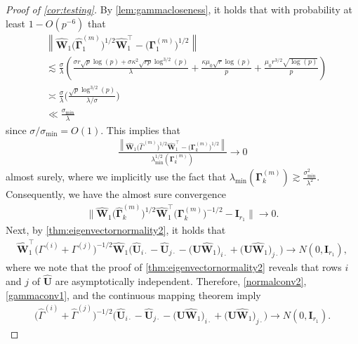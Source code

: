 \documentclass[10pt]{article}
\newcommand{\0}{{\mathbf{0}}}
\newcommand{\1}{{\mathbf{1}}}
\newcommand{\U}{{\mathbf{U}}}
\renewcommand{\t}{^{\top}}
\newcommand{\uhat}{\mathbf{\hat{U}}}
\renewcommand{\hat}{\widehat}
\renewcommand{\hat}{\widehat}
\begin{document}
\begin{proof}[Proof of \cref{cor:testing}]
By \cref{lem:gammacloseness}, it holds that with probability at least $1 - O(p^{-6})$ that
\begin{align*}
    &\left\|\hat{\mathbf{W}}_{1} \big(\mathbf{\hat{\Gamma}}^{(m)}_1\big)^{1/2} \hat{\mathbf{W}}_{1}^{\top}-\big(\mathbf{\Gamma}^{(m)}_1\big)^{1/2}\right\| \\
    &\lesssim \frac{\sigma}{\lambda}\left(\frac{\sigma r \sqrt{p} \log (p)+\sigma \kappa^{2} \sqrt{r p} \log ^{3 / 2}(p)}{\lambda}+\frac{\kappa \mu_{0} \sqrt{r} \log (p)}{p}+\frac{\mu_{0} r^{3 / 2} \sqrt{\log (p)}}{p}\right) \\
    &\asymp \frac{\sigma}{\lambda} \bigg( \frac{\sqrt{p} \log^{3/2}(p)}{\lambda/\sigma} \bigg) \\
    &\ll \frac{\sigma_{\min}}{\lambda}
\end{align*}
since $\sigma/\sigma_{\min} = O(1)$. This implies that
\begin{align*}
  \frac{  \left\|\hat{\mathbf{W}}_{1} \big(\hat{\Gamma}^{(m)}\big)^{1/2} \hat{\mathbf{W}}_{1}^{\top}-\big(\mathbf{\Gamma}^{(m)}_k\big)^{1/2}\right\|}{\lambda_{\min}^{1/2}(\mathbf{\Gamma}^{(m)}_k)} \to 0 
\end{align*}
almost surely, where we implicitly use the fact that $\lambda_{\min}(\mathbf{\Gamma}^{(m)}_k) \gtrsim \frac{\sigma_{\min}^2}{\lambda^2}$.  Consequently, we have the almost sure convergence
\begin{align}
    \| \hat{\mathbf{W}}_{1}\big(\mathbf{\hat \Gamma}^{(m)}_k\big)^{1/2}\hat{\mathbf{W}}_{1}\t \big(\mathbf{\Gamma}^{(m)}_k\big)^{-1/2} - \mathbf{I}_{r_1}\| \to 0. \label{gammaconv1}
\end{align}
Next, by \cref{thm:eigenvectornormality2}, it holds that
\begin{align}
   \mathbf{\hat W}_{1}\t \bigg( \Gamma^{(i)} + \Gamma^{(j)} \bigg)^{-1/2}  \mathbf{\hat W}_{1} \big( \uhat_{i\cdot} - \uhat_{j\cdot} -  \big(\U \mathbf{\hat W}_{1}\big)_{i\cdot} + \big( \U  \mathbf{\hat W}_{1}\big)_{j\cdot} \big) \to N(0, \mathbf{I}_{r_1}), \label{normalconv2}
\end{align}
where we note that the proof of \cref{thm:eigenvectornormality2} reveals that rows $i$ and $j$ of $\uhat$ are asymptotically independent.  
Therefore, \eqref{normalconv2}, \eqref{gammaconv1}, and the continuous mapping theorem imply
\begin{align*}
    \big(\hat \Gamma^{(i)} + \hat \Gamma^{(j)} \big)^{-1/2}\big( \uhat_{i\cdot} - \uhat_{j\cdot} -  \big(\U\mathbf{\hat W}_{1}\big)_{i\cdot} + \big( \U \mathbf{\hat W}_{1}\big)_{j\cdot} \big) \to N(0, \mathbf{I}_{r_1} ).

\end{align*}
\end{proof}
\end{document}
